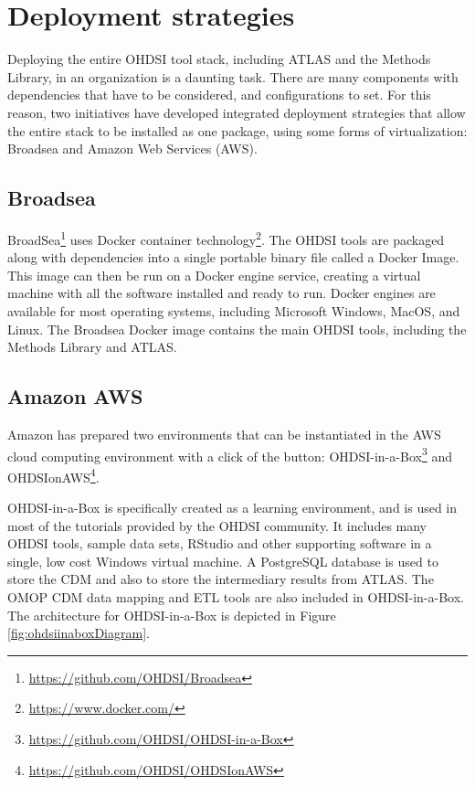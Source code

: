 \documentclass[11pt]{book}
\let\rmarkdownfootnote\footnote%
\def\footnote{\protect\rmarkdownfootnote}
\theoremstyle{definition}
\theoremstyle{definition}
\theoremstyle{definition}
\theoremstyle{remark}
\begin{document}
\hypertarget{deployment-strategies}{%
\section{Deployment strategies}\label{deployment-strategies}}

Deploying the entire OHDSI tool stack, including ATLAS and the Methods Library, in an organization is a daunting task. There are many components with dependencies that have to be considered, and configurations to set. For this reason, two initiatives have developed integrated deployment strategies that allow the entire stack to be installed as one package, using some forms of virtualization: Broadsea and Amazon Web Services (AWS).

\hypertarget{broadsea}{%
\subsection{Broadsea}\label{broadsea}}

BroadSea\footnote{\url{https://github.com/OHDSI/Broadsea}} uses Docker container technology\footnote{\url{https://www.docker.com/}}. The OHDSI tools are packaged along with dependencies into a single portable binary file called a Docker Image. This image can then be run on a Docker engine service, creating a virtual machine with all the software installed and ready to run. Docker engines are available for most operating systems, including Microsoft Windows, MacOS, and Linux. The Broadsea Docker image contains the main OHDSI tools, including the Methods Library and ATLAS.

\hypertarget{amazon-aws}{%
\subsection{Amazon AWS}\label{amazon-aws}}

Amazon has prepared two environments that can be instantiated in the AWS cloud computing environment with a click of the button: OHDSI-in-a-Box\footnote{\url{https://github.com/OHDSI/OHDSI-in-a-Box}} and OHDSIonAWS\footnote{\url{https://github.com/OHDSI/OHDSIonAWS}}.

OHDSI-in-a-Box is specifically created as a learning environment, and is used in most of the tutorials provided by the OHDSI community. It includes many OHDSI tools, sample data sets, RStudio and other supporting software in a single, low cost Windows virtual machine. A PostgreSQL database is used to store the CDM and also to store the intermediary results from ATLAS. The OMOP CDM data mapping and ETL tools are also included in OHDSI-in-a-Box. The architecture for OHDSI-in-a-Box is depicted in Figure \ref{fig:ohdsiinaboxDiagram}.
\end{document}
